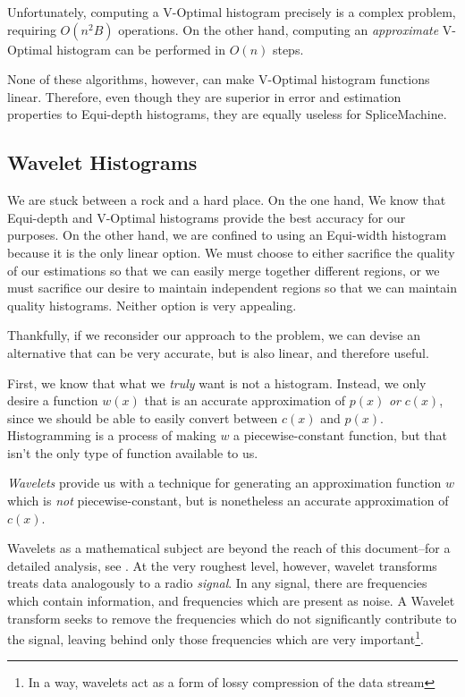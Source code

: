 Unfortunately, computing a V-Optimal histogram precisely is a complex problem, requiring $O(n^2B)$ operations\cite{JagadishOptimalHistograms}. On the other hand, computing an \emph{approximate} V-Optimal histogram can be performed in $O(n)$ steps\cite{GuhaApproximation,GuhaREHIST}. 

None of these algorithms, however, can make V-Optimal histogram functions linear. Therefore, even though they are superior in error and estimation properties to Equi-depth histograms, they are equally useless for SpliceMachine.

\subsection{Wavelet Histograms}
\label{sec:Wavelets}
We are stuck between a rock and a hard place. On the one hand, We know that Equi-depth and V-Optimal histograms provide the best accuracy for our purposes. On the other hand, we are confined to using an Equi-width histogram because it is the only linear option. We must choose to either sacrifice the quality of our estimations so that we can easily merge together different regions, or we must sacrifice our desire to maintain independent regions so that we can maintain quality histograms. Neither option is very appealing.

Thankfully, if we reconsider our approach to the problem, we can devise an alternative that can be very accurate, but is also linear, and therefore useful.

First, we know that what we \emph{truly} want is not a histogram. Instead, we only desire a function $w(x)$ that is an accurate approximation of $p(x)$ \emph{or} $c(x)$, since we should be able to easily convert between $c(x)$ and $p(x)$. Histogramming is a process of making $w$ a piecewise-constant function, but that isn't the only type of function available to us.

\emph{Wavelets} provide us with a technique for generating an approximation function $w$ which is \emph{not} piecewise-constant, but is nonetheless an accurate approximation of $c(x)$.

Wavelets as a mathematical subject are beyond the reach of this document--for a detailed analysis, see \cite{HernandezWavelets}. At the very roughest level, however, wavelet transforms treats data analogously to a radio \emph{signal}. In any signal, there are frequencies which contain information, and frequencies which are present as noise. A Wavelet transform seeks to remove the frequencies which do not significantly contribute to the signal, leaving behind only those frequencies which are very important\footnote{In a way, wavelets act as a form of lossy compression of the data stream}.

